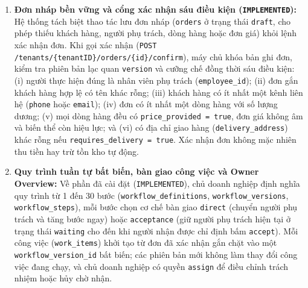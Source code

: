 \begin{enumerate}
    Bảng \texttt{products} tích hợp cột sinh tự động \texttt{search\_\hspace{0pt}vector} (\texttt{tsvector} cấu hình \texttt{'simple'} trên tên, danh mục, mô tả) kèm chỉ mục GIN phục vụ tìm kiếm toàn văn.
  \item \textbf{Đơn nháp bền vững và cổng xác nhận sáu điều kiện (\texttt{IMPLEMENTED}):} Hệ thống tách biệt thao tác lưu đơn nháp (\texttt{orders} ở trạng thái \texttt{draft}, cho phép thiếu khách hàng, người phụ trách, dòng hàng hoặc đơn giá) khỏi lệnh xác nhận đơn.
    Khi gọi xác nhận (\texttt{POST /tenants/\hspace{0pt}\{tenantID\}/\hspace{0pt}orders/\hspace{0pt}\{id\}/\hspace{0pt}confirm}), máy chủ khóa bản ghi đơn, kiểm tra phiên bản lạc quan \texttt{version} và cưỡng chế đồng thời sáu điều kiện: (i) người thực hiện đúng là nhân viên phụ trách (\texttt{employee\_\hspace{0pt}id}); (ii) đơn gắn khách hàng hợp lệ có tên khác rỗng; (iii) khách hàng có ít nhất một kênh liên hệ (\texttt{phone} hoặc \texttt{email}); (iv) đơn có ít nhất một dòng hàng với số lượng dương; (v) mọi dòng hàng đều có \texttt{price\_\hspace{0pt}provided = true}, đơn giá không âm và biến thể còn hiệu lực; và (vi) có địa chỉ giao hàng (\texttt{delivery\_\hspace{0pt}address}) khác rỗng nếu \texttt{requires\_\hspace{0pt}delivery = true}.
    Xác nhận đơn không mặc nhiên thu tiền hay trừ tồn kho tự động.
  \item \textbf{Quy trình tuần tự bất biến, bàn giao công việc và Owner Overview:} Về phần đã cài đặt (\texttt{IMPLEMENTED}), chủ doanh nghiệp định nghĩa quy trình từ 1 đến 30 bước (\texttt{workflow\_\hspace{0pt}definitions}, \texttt{workflow\_\hspace{0pt}versions}, \texttt{workflow\_\hspace{0pt}steps}), mỗi bước chọn cơ chế bàn giao \texttt{direct} (chuyển người phụ trách và tăng bước ngay) hoặc \texttt{acceptance} (giữ người phụ trách hiện tại ở trạng thái \texttt{waiting} cho đến khi người nhận được chỉ định bấm \texttt{accept}).
    Mỗi công việc (\texttt{work\_\hspace{0pt}items}) khởi tạo từ đơn đã xác nhận gắn chặt vào một \texttt{workflow\_\hspace{0pt}version\_\hspace{0pt}id} bất biến; các phiên bản mới không làm thay đổi công việc đang chạy, và chủ doanh nghiệp có quyền \texttt{assign} để điều chỉnh trách nhiệm hoặc hủy chờ nhận.

\end{enumerate}
